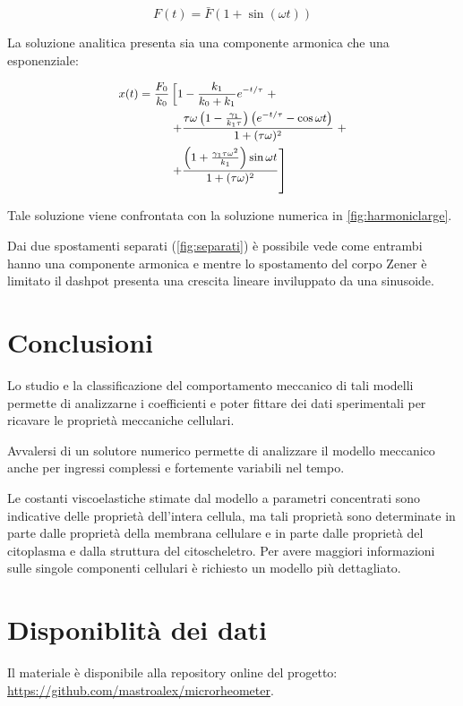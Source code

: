 \begin{equation}
	F(t)=\bar F\left(1+\sin (\omega t)\right)
\end{equation}

La soluzione analitica presenta sia una componente armonica che una esponenziale:

\begin{equation}
	\small{\begin{aligned}
	x(t)=\frac{F_{0}}{k_{0}}& \left[ 1-\frac{k_{1}}{k_{0}+k_{1}} e^{-t / \tau}\right.+ \\
		&\left.+\frac{\tau \omega\left(1-\frac{\gamma_{1}}{k_{1} \tau}\right)\left(e^{-t / \tau}-\cos \omega t\right)}{1+(\tau \omega)^{2}}\right.+\\
		&\left.+\frac{\left(1+\frac{\gamma_{1} \tau \omega^{2}}{k_{1}}\right) \sin \omega t}{1+(\tau \omega)^{2}}\right]
	\end{aligned}}
	\end{equation}

Tale soluzione viene confrontata con la soluzione numerica in \cref{fig:harmoniclarge}. 

Dai due spostamenti separati (\cref{fig:separati}) è possibile vede come entrambi hanno una componente armonica e mentre lo spostamento del corpo Zener è limitato il dashpot presenta una crescita lineare inviluppato da una sinusoide.


\section{Conclusioni}

Lo studio e la classificazione del comportamento meccanico di tali modelli permette di analizzarne i coefficienti e poter fittare dei dati sperimentali per ricavare le proprietà meccaniche cellulari.

Avvalersi di un solutore numerico permette di analizzare il modello meccanico anche per ingressi complessi e fortemente variabili nel tempo. 

Le costanti viscoelastiche stimate dal modello a parametri concentrati sono indicative delle proprietà dell'intera cellula, ma tali proprietà sono determinate in parte dalle proprietà della membrana cellulare e in parte dalle proprietà del citoplasma e dalla struttura del citoscheletro. Per avere maggiori informazioni sulle singole componenti cellulari è richiesto un modello più dettagliato.

\raggedbottom

\pagebreak
\section*{Disponiblità dei dati}

Il materiale è disponibile alla repository online del progetto: \url{https://github.com/mastroalex/microrheometer}.

\printbibliography[title=Riferimenti]



